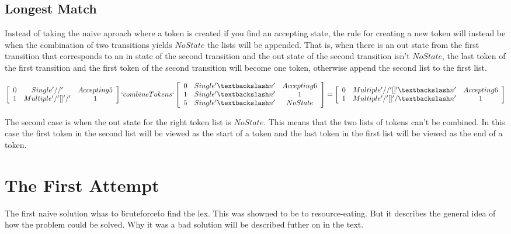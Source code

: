 \subsection{Longest Match}
Instead of taking the naive aproach where a token is created if you find an
accepting state, the rule for creating a new token will instead be when the
combination of two transitions yields $NoState$ the lists will be appended. That
is, when there is an out state from the first transition that corresponds to an
in state of the second transition and the out state of the second transition
isn't $NoState$, the last token of the first transition and the first token of
the second transition will become one token, otherwise append the second list to
the first list.
\begin{center}
$\left[\begin{array}{ccc}
0&Single '//'& Accepting 5\\
1&Multiple '/' [] '/' &1\\
\end{array}\right] `combineTokens` 
\left[\begin{array}{ccc}
0&Single '\textbackslash n'&Accepting 6\\
1&Single '\textbackslash n'&1\\
5&Single '\textbackslash n'&NoState\\
\end{array}\right] =
\left[\begin{array}{ccc}
0&Multiple '//' [] '\textbackslash n'&Accepting 6\\
1&Multiple '/' [] '/\textbackslash n'&1\\
\end{array}\right]$
\end{center}
The second case is when the out state for the right token list is $NoState$.
This means that the two lists of tokens can't be combined. In this case the
first token in the second list will be viewed as the start of a token and the
last token in the first list will be viewed as the end of a token.

\section{The First Attempt}
The first naive solution whas to \"bruteforce\" to find the lex. This was showned to be to resource-eating. But it describes the general idea of how the problem could be solved. Why it was a bad solution will be described futher on in the text. 

